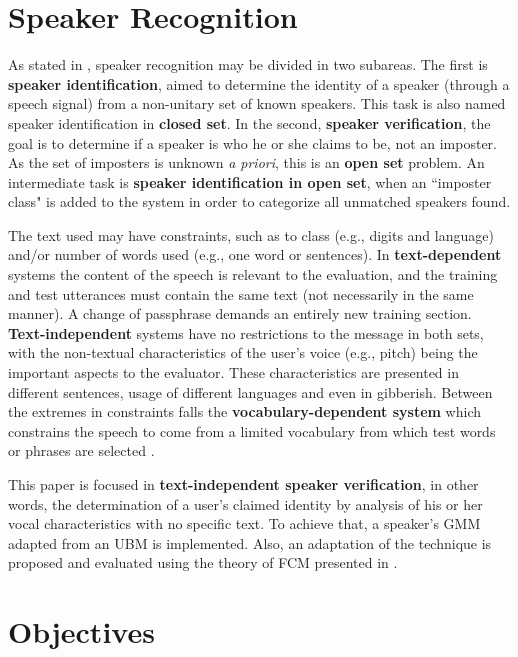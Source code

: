 \section{Speaker Recognition}

As stated in \cite{pinheiro.2013}, speaker recognition may be divided in two subareas. The first is \textbf{speaker identification}, aimed to determine the identity of a speaker (through a speech signal) from a non-unitary set of known speakers. This task is also named speaker identification in \textbf{closed set}. In the second, \textbf{speaker verification}, the goal is to determine if a speaker is who he or she claims to be, not an imposter. As the set of imposters is unknown \emph{a priori}, this is an \textbf{open set} problem. An intermediate task is \textbf{speaker identification in open set}, when an ``imposter class" is added to the system in order to categorize all unmatched speakers found.

The text used may have constraints, such as to class (e.g., digits and language) and/or number of words used (e.g., one word or sentences). In \textbf{text-dependent} systems the content of the speech is relevant to the evaluation, and the training and test utterances must contain the same text (not necessarily in the same manner). A change of passphrase demands an entirely new training section. \textbf{Text-independent} systems have no restrictions to the message in both sets, with the non-textual characteristics of the user's voice (e.g., pitch) being the important aspects to the evaluator. These characteristics are presented in different sentences, usage of different languages and even in gibberish. Between the extremes in constraints falls the \textbf{vocabulary-dependent system} which constrains the speech to come from a limited vocabulary from which test words or phrases are selected \cite{reynolds.1995}.

This paper is focused in \textbf{text-independent speaker verification}, in other words, the determination of a user's claimed identity by analysis of his or her vocal characteristics with no specific text. To achieve that, a speaker's GMM adapted from an UBM \cite{reynolds.quatieri.dunn.2000} is implemented. Also, an adaptation of the technique is proposed and evaluated using the theory of FCM presented in \cite{gao.zhou.pu.2013}.

\section{Objectives}

